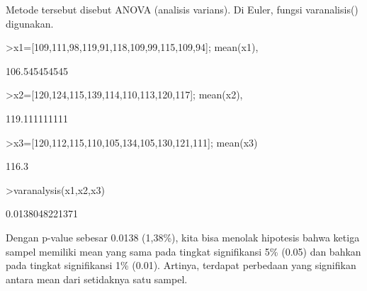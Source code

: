 \documentclass[a4paper,10pt]{article}
\begin{document}
\begin{eulernotebook}
\begin{eulercomment}
\begin{eulercomment}
\begin{eulercomment}
\begin{eulercomment}
\begin{eulercomment}
Metode tersebut disebut ANOVA (analisis varians). Di Euler, fungsi
varanalisis() digunakan.
\end{eulercomment}
\begin{eulerprompt}
>x1=[109,111,98,119,91,118,109,99,115,109,94]; mean(x1),
\end{eulerprompt}
\begin{euleroutput}
  106.545454545
\end{euleroutput}
\begin{eulerprompt}
>x2=[120,124,115,139,114,110,113,120,117]; mean(x2),
\end{eulerprompt}
\begin{euleroutput}
  119.111111111
\end{euleroutput}
\begin{eulerprompt}
>x3=[120,112,115,110,105,134,105,130,121,111]; mean(x3)
\end{eulerprompt}
\begin{euleroutput}
  116.3
\end{euleroutput}
\begin{eulerprompt}
>varanalysis(x1,x2,x3)
\end{eulerprompt}
\begin{euleroutput}
  0.0138048221371
\end{euleroutput}
\begin{eulercomment}
Dengan p-value sebesar 0.0138 (1,38\%), kita bisa menolak hipotesis
bahwa ketiga sampel memiliki mean yang sama pada tingkat signifikansi
5\% (0.05) dan bahkan pada tingkat signifikansi 1\% (0.01). Artinya,
terdapat perbedaan yang signifikan antara mean dari setidaknya satu
sampel.


\end{eulercomment}
\end{eulercomment}
\end{eulercomment}
\end{eulercomment}
\end{eulercomment}
\end{eulernotebook}
\end{document}
